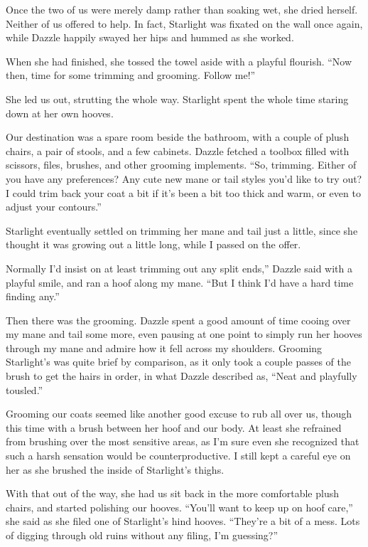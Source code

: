 Once the two of us were merely damp rather than soaking wet, she dried herself. Neither of us offered to help. In fact, Starlight was fixated on the wall once again, while Dazzle happily swayed her hips and hummed as she worked.

When she had finished, she tossed the towel aside with a playful flourish. “Now then, time for some trimming and grooming. Follow me!”

She led us out, strutting the whole way. Starlight spent the whole time staring down at her own hooves.

Our destination was a spare room beside the bathroom, with a couple of plush chairs, a pair of stools, and a few cabinets. Dazzle fetched a toolbox filled with scissors, files, brushes, and other grooming implements. “So, trimming. Either of you have any preferences? Any cute new mane or tail styles you’d like to try out? I could trim back your coat a bit if it’s been a bit too thick and warm, or even to adjust your contours.”

Starlight eventually settled on trimming her mane and tail just a little, since she thought it was growing out a little long, while I passed on the offer.

\leavevmode{}Normally I’d insist on at least trimming out any split ends,” Dazzle said with a playful smile, and ran a hoof along my mane. “But I think I’d have a hard time finding any.”

Then there was the grooming. Dazzle spent a good amount of time cooing over my mane and tail some more, even pausing at one point to simply run her hooves through my mane and admire how it fell across my shoulders. Grooming Starlight’s was quite brief by comparison, as it only took a couple passes of the brush to get the hairs in order, in what Dazzle described as, “Neat and playfully tousled.”

Grooming our coats seemed like another good excuse to rub all over us, though this time with a brush between her hoof and our body. At least she refrained from brushing over the most sensitive areas, as I’m sure even she recognized that such a harsh sensation would be counterproductive. I still kept a careful eye on her as she brushed the inside of Starlight’s thighs.

With that out of the way, she had us sit back in the more comfortable plush chairs, and started polishing our hooves. “You’ll want to keep up on hoof care,” she said as she filed one of Starlight’s hind hooves. “They’re a bit of a mess. Lots of digging through old ruins without any filing, I’m guessing?”

